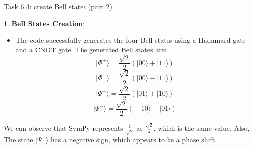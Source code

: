 \documentclass[aspectratio=169]{beamer}
\begin{document}
\begin{frame}{Task 6.4: create Bell states (part 2)}

1. \textbf{Bell States Creation}:
   \begin{itemize}
      \item The code successfully generates the four Bell states using a Hadamard gate and a CNOT gate. The generated Bell states are:
      \[
      |\Phi^+\rangle = \frac{\sqrt{2}}{2} (|00\rangle + |11\rangle)
      \]
      \[
      |\Phi^-\rangle = \frac{\sqrt{2}}{2} (|00\rangle - |11\rangle)
      \]
      \[
      |\Psi^+\rangle = \frac{\sqrt{2}}{2} (|01\rangle + |10\rangle)
      \]
      \[
      |\Psi^-\rangle = \frac{\sqrt{2}}{2} (-|10\rangle + |01\rangle)
      \]
   \end{itemize}
We can observe that SymPy represents \(\frac{1}{\sqrt{2}}\) as \(\frac{\sqrt{2}}{2}\), which is the same value. Also, The state \(|\Psi^-\rangle\) has a negative sign, which appears to be a phase shift.


\end{frame}
\end{document}
